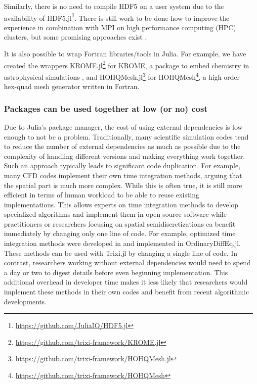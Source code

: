 \documentclass{juliacon}
\newcommand{\trixi}{Trixi.jl\xspace}
\begin{document}
Similarly, there is no need to compile HDF5 on a user system due to the
availability of HDF5.jl\footnote{\url{https://github.com/JuliaIO/HDF5.jl}}.
There is still work to be done how to improve the experience in combination
with MPI on high performance computing (HPC) clusters, but some promising
approaches exist \cite{byrne2021mpi}.

It is also possible to wrap Fortran libraries/tools in Julia. For example, we
have created the wrappers KROME.jl\footnote{\url{https://github.com/trixi-framework/KROME.jl}}
for KROME, a package to embed chemistry in astrophysical simulations
\cite{grassi2014krome}, and HOHQMesh.jl\footnote{\url{https://github.com/trixi-framework/HOHQMesh.jl}}
for HOHQMesh\footnote{\url{https://github.com/trixi-framework/HOHQMesh}}, a high order
hex-quad mesh generator written in Fortran.

\subsubsection{Packages can be used together at low (or no) cost}

Due to Julia's package manager, the cost of using external dependencies is low
enough to not be a problem. Traditionally, many scientific simulation codes tend
to reduce the number of external dependencies as much as possible due to the
complexity of handling different versions and making everything work together.
Such an approach typically leads to significant code duplication. For example, many
CFD codes implement their own time integration methods, arguing that the spatial
part is much more complex. While this is often true, it is still more efficient
in terms of human workload to be able to reuse existing implementations. This
allows experts on time integration methods to develop specialized algorithms and
implement them in open source software while practitioners or researchers focusing
on spatial semidiscretizations ca benefit immediately by changing only one line
of code. For example, optimized time integration methods were developed in
\cite{ranocha2021optimized} and implemented in OrdinaryDiffEq.jl. These methods
can be used with \trixi by changing a single line of code. In contrast, researchers
working without external dependencies would need to spend a day or two to digest
details before even beginning implementation. This additional overhead in developer
time makes it less likely that researchers would implement these methods in their own 
codes and benefit from recent algorithmic developments. 
\end{document}

